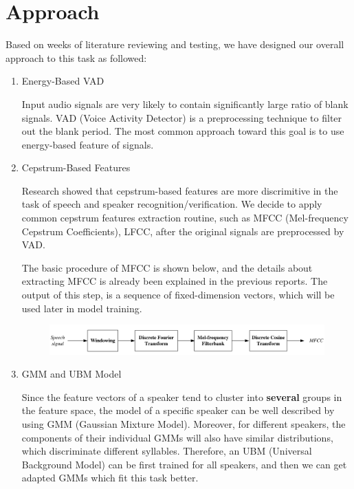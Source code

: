 \section{Approach}

Based on weeks of literature reviewing and testing,
we have designed our overall approach to this task as followed:

\begin{enumerate}
    \item Energy-Based VAD

      Input audio signals are very likely to contain significantly large ratio of blank signals.
      VAD (Voice Activity Detector)
      is a preprocessing technique to filter out the blank period.
      The most common approach toward this goal is to use energy-based feature of signals.

      \item Cepstrum-Based Features

        Research showed that cepstrum-based features are more discrimitive in the task of speech and speaker recognition/verification.
        We decide to apply common cepstrum features extraction routine, such as MFCC (Mel-frequency Cepstrum Coefficients), LFCC,
        after the original signals are preprocessed by VAD.

       The basic procedure of MFCC is shown below, and the details about
       extracting MFCC is already been explained in the previous reports.
       The output of this step, is a sequence of fixed-dimension vectors, which will be used later in model training.

      \begin{figure}[H]
        \centering
        \includegraphics[width=\textwidth]{res/MFCC.png}
      \end{figure}

    \item GMM and UBM Model

      Since the feature vectors of a speaker tend to cluster into \textbf{several} groups
      in the feature space,
      the model of a specific speaker can be well described by using GMM (Gaussian Mixture Model).
      Moreover, for different speakers, the components of their individual GMMs
      will also have similar distributions, which discriminate different syllables.
      Therefore, an UBM (Universal Background Model) can be first trained for all speakers,
      and then we can get adapted GMMs which fit this task better.


\end{enumerate}
